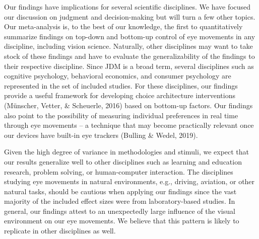\documentclass{article}
\begin{document}


Our findings have implications for several scientific disciplines. We have focused our discussion on judgment and decision-making but will turn a few other topics. Our meta-analysis is, to the best of our knowledge, the first to quantitatively summarize findings on top-down and bottom-up control of eye movements in any discipline, including vision science. Naturally, other disciplines may want to take stock of these findings and have to evaluate the generalizability of the findings to their respective discipline. Since JDM is a broad term, several disciplines such as cognitive psychology, behavioral economics, and consumer psychology are represented in the set of included studies. For these disciplines, our findings provide a useful framework for developing choice architecture interventions (Münscher, Vetter, \& Scheuerle, 2016) based on bottom-up factors. Our findings also point to the possibility of measuring individual preferences in real time through eye movements – a technique that may become practically relevant once our devices have built-in eye trackers (Bulling \& Wedel, 2019).    

Given the high degree of variance in methodologies and stimuli, we expect that our results generalize well to other disciplines such as learning and education research, problem solving, or human-computer interaction. The disciplines studying eye movements in natural environments, e.g., driving, aviation, or other natural tasks, should be cautious when applying our findings since the vast majority of the included effect sizes were from laboratory-based studies. In general, our findings attest to an unexpectedly large influence of the visual environment on our eye movements. We believe that this pattern is likely to replicate in other disciplines as well.


\end{document}
